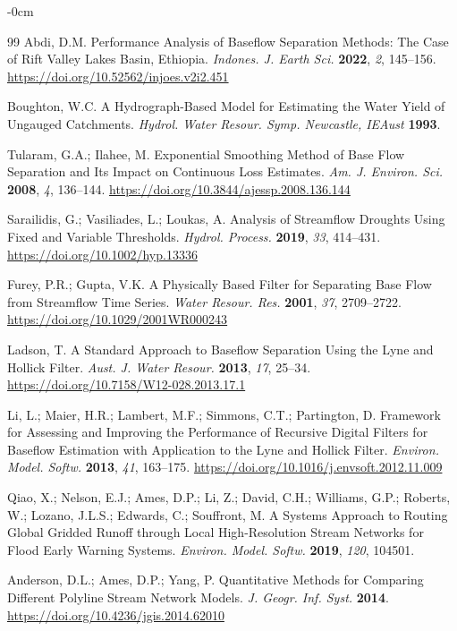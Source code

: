 \documentclass[hydrology,article,submit,pdftex,moreauthors]{Definitions/mdpi}
\begin{document}
\begin{adjustwidth}{-\extralength}{0cm}
\begin{thebibliography}{99}
Abdi, D.M. Performance Analysis of Baseflow Separation Methods: The Case of Rift Valley Lakes Basin, Ethiopia. \textit{Indones. J. Earth Sci.} \textbf{2022}, \textit{2}, 145--156. \url{https://doi.org/10.52562/injoes.v2i2.451}

Boughton, W.C. A Hydrograph-Based Model for Estimating the Water Yield of Ungauged Catchments. \textit{Hydrol. Water Resour. Symp. Newcastle, IEAust} \textbf{1993}.

Tularam, G.A.; Ilahee, M. Exponential Smoothing Method of Base Flow Separation and Its Impact on Continuous Loss Estimates. \textit{Am. J. Environ. Sci.} \textbf{2008}, \textit{4}, 136--144. \url{https://doi.org/10.3844/ajessp.2008.136.144}

Sarailidis, G.; Vasiliades, L.; Loukas, A. Analysis of Streamflow Droughts Using Fixed and Variable Thresholds. \textit{Hydrol. Process.} \textbf{2019}, \textit{33}, 414--431. \url{https://doi.org/10.1002/hyp.13336}

Furey, P.R.; Gupta, V.K. A Physically Based Filter for Separating Base Flow from Streamflow Time Series. \textit{Water Resour. Res.} \textbf{2001}, \textit{37}, 2709--2722. \url{https://doi.org/10.1029/2001WR000243}

Ladson, T. A Standard Approach to Baseflow Separation Using the Lyne and Hollick Filter. \textit{Aust. J. Water Resour.} \textbf{2013}, \textit{17}, 25--34. \url{https://doi.org/10.7158/W12-028.2013.17.1}

Li, L.; Maier, H.R.; Lambert, M.F.; Simmons, C.T.; Partington, D. Framework for Assessing and Improving the Performance of Recursive Digital Filters for Baseflow Estimation with Application to the Lyne and Hollick Filter. \textit{Environ. Model. Softw.} \textbf{2013}, \textit{41}, 163--175. \url{https://doi.org/10.1016/j.envsoft.2012.11.009}

Qiao, X.; Nelson, E.J.; Ames, D.P.; Li, Z.; David, C.H.; Williams, G.P.; Roberts, W.; Lozano, J.L.S.; Edwards, C.; Souffront, M. A Systems Approach to Routing Global Gridded Runoff through Local High-Resolution Stream Networks for Flood Early Warning Systems. \textit{Environ. Model. Softw.} \textbf{2019}, \textit{120}, 104501.

Anderson, D.L.; Ames, D.P.; Yang, P. Quantitative Methods for Comparing Different Polyline Stream Network Models. \textit{J. Geogr. Inf. Syst.} \textbf{2014}. \url{https://doi.org/10.4236/jgis.2014.62010}


\end{thebibliography}
\end{adjustwidth}
\end{document}

